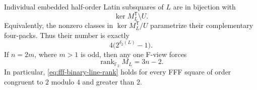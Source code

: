 \begin{theorem}
\label{thm:binary-kernel-subsquares}
Individual embedded half-order Latin subsquares of $L$ are in bijection with
\[
 \ker M_L^{\mathsf T}\setminus U.
\]
Equivalently, the nonzero classes in
$\ker M_L^{\mathsf T}/U$ parametrize their complementary four-packs.  Thus
their number is exactly
\begin{equation}
 4\bigl(2^{\delta_2(L)}-1\bigr).\label{eq:half-order-count}
\end{equation}
If $n=2m$, where $m>1$ is odd, then any one F-view forces
\begin{equation}
 \operatorname{rank}_{\mathbb F_2}M_L=3n-2.\label{eq:fff-binary-line-rank}
\end{equation}
In particular, \eqref{eq:fff-binary-line-rank} holds for every FFF square of order congruent to $2$
modulo $4$ and greater than $2$.
\end{theorem}

